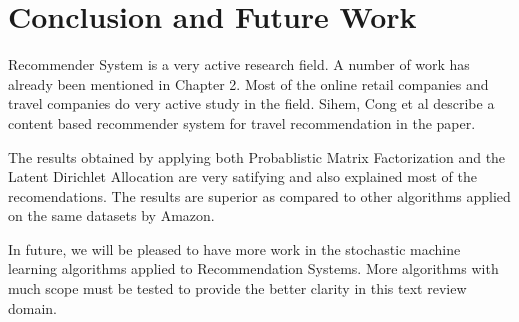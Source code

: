 \chapter{Conclusion and Future Work}
Recommender System is a very active research field. A number of work has already been mentioned in Chapter 2. Most of the online retail companies and travel companies do very active study in the field. Sihem, Cong et al describe a content based recommender system for travel recommendation in the paper.

The results obtained by applying both Probablistic Matrix Factorization and the Latent Dirichlet Allocation are very satifying and also explained most of the recomendations. The results are superior as compared to other algorithms applied on the same datasets by Amazon. 

In future, we will be pleased to have more work in the stochastic machine learning algorithms applied to Recommendation Systems. More algorithms with much scope must be tested to provide the better clarity in this text review domain.



